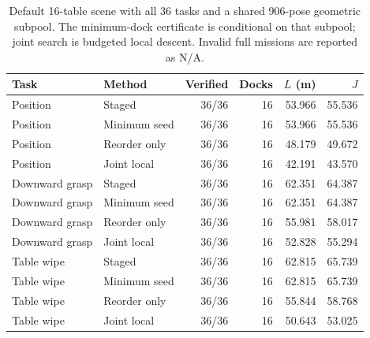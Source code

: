 \begin{table}[t]
\centering
\caption{Default 16-table scene with all 36 tasks and a shared 906-pose geometric subpool. The minimum-dock certificate is conditional on that subpool; joint search is budgeted local descent. Invalid full missions are reported as N/A.}
\label{tab:main-task-navigation}
\begin{tabular}{llrrrr}
\toprule
Task & Method & Verified & Docks & $L$ (m) & $J$ \\
\midrule
Position & Staged & 36/36 & 16 & 53.966 & 55.536 \\
Position & Minimum seed & 36/36 & 16 & 53.966 & 55.536 \\
Position & Reorder only & 36/36 & 16 & 48.179 & 49.672 \\
Position & Joint local & 36/36 & 16 & 42.191 & 43.570 \\
Downward grasp & Staged & 36/36 & 16 & 62.351 & 64.387 \\
Downward grasp & Minimum seed & 36/36 & 16 & 62.351 & 64.387 \\
Downward grasp & Reorder only & 36/36 & 16 & 55.981 & 58.017 \\
Downward grasp & Joint local & 36/36 & 16 & 52.828 & 55.294 \\
Table wipe & Staged & 36/36 & 16 & 62.815 & 65.739 \\
Table wipe & Minimum seed & 36/36 & 16 & 62.815 & 65.739 \\
Table wipe & Reorder only & 36/36 & 16 & 55.844 & 58.768 \\
Table wipe & Joint local & 36/36 & 16 & 50.643 & 53.025 \\
\bottomrule
\end{tabular}
\end{table}
